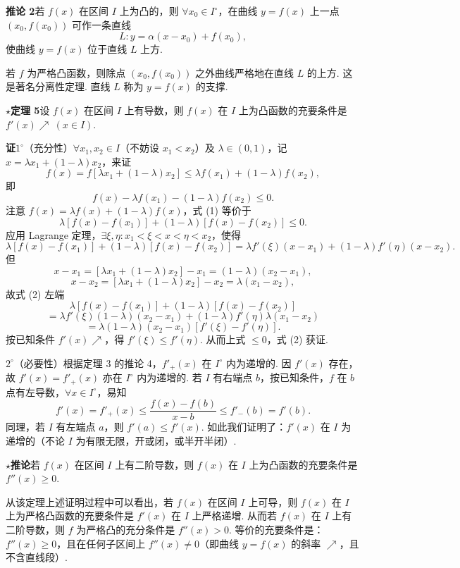 \documentclass[UTF8,12pt,a4paper,fontset=fandol]{ctexart}
\begin{document}
\noindent\textbf{推论 2}\quad 若 $f(x)$ 在区间 $I$ 上为凸的，则 $\forall x_0\in I^\circ$，在曲线 $y=f(x)$ 上一点 $(x_0,f(x_0))$ 可作一条直线
\[
  L:y=\alpha(x-x_0)+f(x_0),
\]
使曲线 $y=f(x)$ 位于直线 $L$ 上方.

若 $f$ 为严格凸函数，则除点 $(x_0,f(x_0))$ 之外曲线严格地在直线 $L$ 的上方. 这是著名分离性定理. 直线 $L$ 称为 $y=f(x)$ 的支撑.

\noindent\textbf{$\star$定理 5}\quad 设 $f(x)$ 在区间 $I$ 上有导数，则 $f(x)$ 在 $I$ 上为凸函数的充要条件是 $f'(x)\nearrow\ (x\in I)$.

\noindent\textbf{证}\quad $1^\circ$（充分性）$\forall x_1,x_2\in I$（不妨设 $x_1<x_2$）及 $\lambda\in(0,1)$，记 $x=\lambda x_1+(1-\lambda)x_2$，来证
\[
  f(x)=f[\lambda x_1+(1-\lambda)x_2]\le \lambda f(x_1)+(1-\lambda)f(x_2),
\]
即
\[
  f(x)-\lambda f(x_1)-(1-\lambda)f(x_2)\le0. \tag{1}
\]
注意 $f(x)=\lambda f(x)+(1-\lambda)f(x)$，式 (1) 等价于
\[
  \lambda[f(x)-f(x_1)]+(1-\lambda)[f(x)-f(x_2)]\le0. \tag{2}
\]
应用 Lagrange 定理，$\exists\xi,\eta:x_1<\xi<x<\eta<x_2$，使得
\[
  \lambda[f(x)-f(x_1)]+(1-\lambda)[f(x)-f(x_2)]
  =\lambda f'(\xi)(x-x_1)+(1-\lambda)f'(\eta)(x-x_2).
\]
但
\[
  x-x_1=[\lambda x_1+(1-\lambda)x_2]-x_1=(1-\lambda)(x_2-x_1),
\]
\[
  x-x_2=[\lambda x_1+(1-\lambda)x_2]-x_2=\lambda(x_1-x_2),
\]
故式 (2) 左端
\[
  \lambda[f(x)-f(x_1)]+(1-\lambda)[f(x)-f(x_2)]
\]
\[
  =\lambda f'(\xi)(1-\lambda)(x_2-x_1)
  +(1-\lambda)f'(\eta)\lambda(x_1-x_2)
\]
\[
  =\lambda(1-\lambda)(x_2-x_1)[f'(\xi)-f'(\eta)]. \tag{3}
\]
按已知条件 $f'(x)\nearrow$，得 $f'(\xi)\le f'(\eta)$. 从而上式 $\le0$，式 (2) 获证.

$2^\circ$（必要性）根据定理 3 的推论 4，$f'_+(x)$ 在 $I^\circ$ 内为递增的. 因 $f'(x)$ 存在，故 $f'(x)=f'_+(x)$ 亦在 $I^\circ$ 内为递增的. 若 $I$ 有右端点 $b$，按已知条件，$f$ 在 $b$ 点有左导数，$\forall x\in I^\circ$，易知
\[
  f'(x)=f'_+(x)\le \frac{f(x)-f(b)}{x-b}\le f'_-(b)=f'(b).
\]
同理，若 $I$ 有左端点 $a$，则 $f'(a)\le f'(x)$. 如此我们证明了：$f'(x)$ 在 $I$ 为递增的（不论 $I$ 为有限无限，开或闭，或半开半闭）.

\noindent\textbf{$\star$推论}\quad 若 $f(x)$ 在区间 $I$ 上有二阶导数，则 $f(x)$ 在 $I$ 上为凸函数的充要条件是 $f''(x)\ge0$.

从该定理上述证明过程中可以看出，若 $f(x)$ 在区间 $I$ 上可导，则 $f(x)$ 在 $I$ 上为严格凸函数的充要条件是 $f'(x)$ 在 $I$ 上严格递增. 从而若 $f(x)$ 在 $I$ 上有二阶导数，则 $f$ 为严格凸的充分条件是 $f''(x)>0$. 等价的充要条件是：$f''(x)\ge0$，且在任何子区间上 $f''(x)\ne0$（即曲线 $y=f(x)$ 的斜率 $\nearrow$，且不含直线段）.
\end{document}
